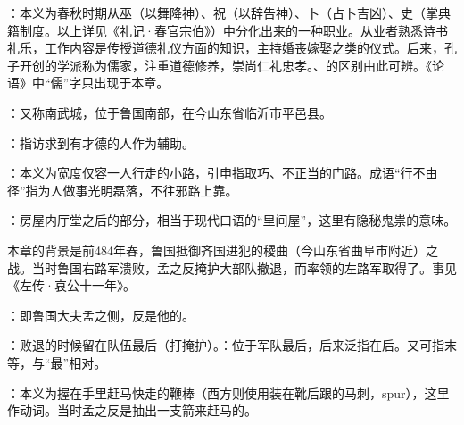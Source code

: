 {
\item {}：本义为春秋时期从巫（以舞降神）、祝（以辞告神）、卜（占卜吉凶）、史（掌典籍制度。以上详见《礼记·春官宗伯》）中分化出来的一种职业。从业者熟悉诗书礼乐，工作内容是传授道德礼仪方面的知识，主持婚丧嫁娶之类的仪式。后来，孔子开创的学派称为儒家，注重道德修养，崇尚仁礼忠孝。、的区别由此可辨。《论语》中“儒”字只出现于本章。
}
{}


{
\item {}：又称南武城，位于鲁国南部，在今山东省临沂市平邑县。
\item {}：指访求到有才德的人作为辅助。
\item {}：本义为宽度仅容一人行走的小路，引申指取巧、不正当的门路。成语“行不由径”指为人做事光明磊落，不往邪路上靠。
\item {}：房屋内厅堂之后的部分，相当于现代口语的“里间屋”，这里有隐秘鬼祟的意味。
}
{}  %


{本章的背景是前484年春，鲁国抵御齐国进犯的稷曲（今山东省曲阜市附近）之战。当时鲁国右路军溃败，孟之反掩护大部队撤退，而率领的左路军取得了。事见《左传·哀公十一年》。
\begin{lyblobitemize}
\item {}：即鲁国大夫孟之侧，反是他的。
\item {}：败退的时候留在队伍最后（打掩护）。：位于军队最后，后来泛指在后。又可指末等，与“最”相对。
\item {}：本义为握在手里赶马快走的鞭棒（西方则使用装在靴后跟的马刺，spur），这里作动词。当时孟之反是抽出一支箭来赶马的。
\end{lyblobitemize}
}
{}



